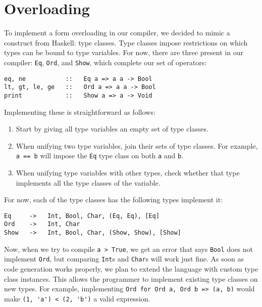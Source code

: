 \section{Overloading}
To implement a form overloading in our compiler, we decided to mimic a construct from Haskell: type classes. Type classes impose restrictions on which types can be bound to type variables. For now, there are three present in our compiler: \lstinline|Eq|, \lstinline|Ord|, and \lstinline|Show|, which complete our set of operators:
\begin{lstlisting}[language=spl]
eq, ne           ::   Eq a => a a -> Bool
lt, gt, le, ge   ::   Ord a => a a -> Bool
print            ::   Show a => a -> Void
\end{lstlisting}
Implementing these is straightforward as follows:
\begin{enumerate}
    \item Start by giving all type variables an empty set of type classes.
    \item When unifying two type variables, join their sets of type classes. For example, \lstinline|a == b| will impose the \lstinline|Eq| type class on both \lstinline|a| and \lstinline|b|.
    \item When unifying type variables with other types, check whether that type implements all the type classes of the variable.
\end{enumerate}
For now, each of the type classes has the following types implement it:
\begin{lstlisting}[language=spl]
Eq     ->   Int, Bool, Char, (Eq, Eq), [Eq]
Ord    ->   Int, Char
Show   ->   Int, Bool, Char, (Show, Show), [Show]
\end{lstlisting}
Now, when we try to compile \lstinline|a > True|, we get an error that says \lstinline|Bool| does not implement \lstinline|Ord|, but comparing \lstinline|Int|s and \lstinline|Char|s will work just fine. As soon as code generation works properly, we plan to extend the language with custom type class instances. This allows the programmer to implement existing type classes on new types. For example, implementing \lstinline|Ord for Ord a, Ord b => (a, b)| would make \lstinline|(1, 'a') < (2, 'b')| a valid expression.

